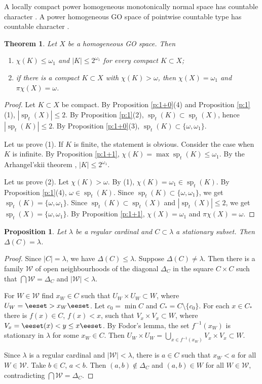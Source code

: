 \documentclass[preprint]{elsarticle}
\def\om{\omega}
\def\la{\lambda}
\def\cW{\mathcal{W}}
\def\sp{\operatorname{sp}}
\def\sset#1{\{#1\}}
\def\set#1{\bbset#1\eeset}
\def\bbset#1:#2\eeset{\{#1\,:\,#2\}}
\def\D{\Delta}
\newtheorem{proposition}{Proposition}[section]
\newtheorem{theorem}{Theorem}[section]
\theoremstyle{definition}
\theoremstyle{remark}
\begin{document}
A locally compact power homogeneous monotonically normal space has countable character \cite[Corollary 3.22]{Arhangelskii2004}.
A power homogeneous GO space of pointwise countable type has countable character \cite[Corollary 29]{Arhangelskii2005}.

\begin{theorem}\label{t:main:1}
Let $X$ be a homogeneous GO space. Then
\begin{enumerate}
\item
$\chi(K)\leq\om_1$ and $|K|\leq 2^{\om_1}$ for every compact $K\subset X$;
\item
if there is a compact $K\subset X$ with $\chi(K)>\om$, then $\chi(X)=\om_1$ and $\pi\chi(X)=\om$.
\end{enumerate}
\end{theorem}
\begin{proof}
Let $K\subset X$ be compact.
By Proposition \ref{p:1+0}(4) and Proposition \ref{p:1}(1), $|\sp_t(X)|\leq 2$.
By Proposition \ref{p:1}(2), $\sp_t(K)\subset \sp_t(X)$, hence $|\sp_t(K)|\leq 2$.
By Proposition \ref{p:1+0}(3), $\sp_t(K)\subset\sset{\om,\om_1}$.

Let us prove (1). If $K$ is finite, the statement is obvious. Consider the case when $K$ is infinite.
By Proposition \ref{p:1+1}, $\chi(K)=\max \sp_t(K)\leq \om_1$.
By the Arhangel'skii theorem
\cite[Theorem 4.5]{Hodel1984handbook}, $|K|\leq 2^{\om_1}$.

Let us prove (2). Let $\chi(K)>\om$. By (1), $\chi(K)=\om_1\in \sp_t(K)$.
By Proposition \ref{p:1}(4), $\om\in \sp_t(K)$. Since $\sp_t(K)\subset\sset{\om,\om_1}$, we get $\sp_t(K)=\sset{\om,\om_1}$. Since $\sp_t(K)\subset \sp_t(X)$ and $|\sp_t(X)|\leq 2$, we get $\sp_t(X)=\sset{\om,\om_1}$. By Proposition \ref{p:1+1}, $\chi(X)=\om_1$ and $\pi\chi(X)=\om$.
\end{proof}


\begin{proposition}\label{p:main:1}
Let $\la$ be a regular cardinal and $C\subset \la$ a stationary subset. Then $\D(C)=\la$.
\end{proposition}
\begin{proof}
Since $|C|=\la$, we have $\D(C)\leq\la$. Suppose $\D(C)\neq\la$. Then there is a family $\cW$ of open neighbourhoods of the diagonal $\D_C$ in the square $C\times C$ such that $\bigcap\cW=\D_C$ and $|\cW|<\la$.

For $W\in\cW$ find $x_W\in C$ such that $U_W\times U_W\subset W$, where $U_W=\set{x\in C: x> x_W}$. Let $c_0=\min C$ and $C_*=C\setminus \sset{c_0}$. For each $x\in C_*$ there is $f(x)\in C$, $f(x)<x$, such that $V_x \times V_x\subset W$, where $V_x=\set{y\in C: f(x)< y \leq x}$. By Fodor's lemma, the set $f^{-1}(x_W)$ is stationary in $\la$ for some $x_W\in C$. Then $U_W\times U_W=\bigcup_{x\in f^{-1}(x_W)}V_x\times V_x\subset W$.

Since $\la$ is a regular cardinal and $|\cW|<\la$, there is $a\in C$ such that $x_W<a$ for all $W\in \cW$. Take $b\in C$, $a<b$. Then $(a,b)\notin \D_C$ and $(a,b)\in W$ for all $W\in\cW$, contradicting $\bigcap\cW=\D_C$.
\end{proof}
\end{document}
